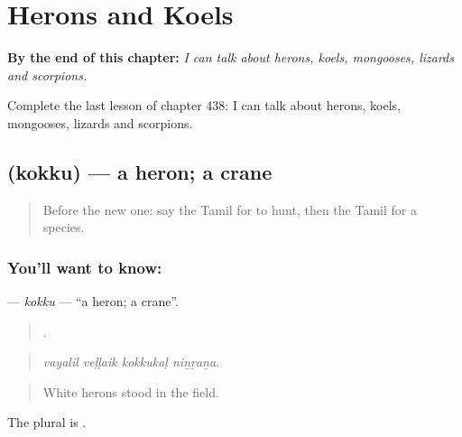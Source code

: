 
\chapter{Herons and Koels}
\label{ch:ta-herons-and-koels}

\begin{chapteropening}
\textbf{By the end of this chapter:} \emph{I can talk about herons, koels, mongooses, lizards and scorpions.}

Complete the last lesson of chapter 438: I can talk about herons, koels, mongooses, lizards and scorpions.
\end{chapteropening}

\section[\texorpdfstring{\ta{கொக்கு} (kokku)}{கொக்கு (kokku)}]{ (kokku) — a heron; a crane}

\label{lesson:TA-C438-kokku}



\begin{quote}
Before the new one: say the Tamil for to hunt, then the Tamil for a species.
\end{quote}

\subsection*{You'll want to know: }
\textbf{} — \emph{kokku} — \textquotedblleft{}a heron; a crane\textquotedblright{}.

\begin{quote}
   .
\end{quote}

\begin{quote}
\emph{vayalil veḷḷaik kokkukaḷ niṉṟaṉa.}
\end{quote}

\begin{quote}
White herons stood in the field.
\end{quote}

The plural is .

